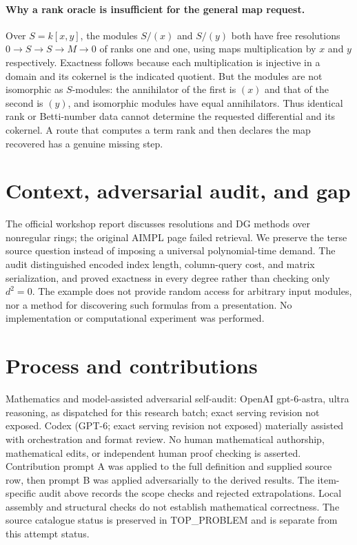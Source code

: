 \documentclass[11pt]{article}
\begin{document}
\paragraph{Why a rank oracle is insufficient for the general map request.}
Over $S=k[x,y]$, the modules $S/(x)$ and $S/(y)$ both have free resolutions
$0\to S\to S\to M\to0$ of ranks one and one, using maps multiplication
by $x$ and $y$ respectively. Exactness follows because each multiplication
is injective in a domain and its cokernel is the indicated quotient.
But the modules are not isomorphic as $S$-modules: the annihilator of the
first is $(x)$ and that of the second is $(y)$, and isomorphic modules have
equal annihilators. Thus identical rank or Betti-number data cannot determine
the requested differential and its cokernel. A route that computes a term
rank and then declares the map recovered has a genuine missing step.

\section{Context, adversarial audit, and gap}
The official workshop report discusses resolutions and DG methods over
nonregular rings; the original AIMPL page failed retrieval. We preserve the
terse source question instead of imposing a universal polynomial-time demand.
The audit distinguished encoded index length, column-query cost, and matrix
serialization, and proved exactness in every degree rather than checking
only $d^2=0$. The example does not provide random access for arbitrary input
modules, nor a method for discovering such formulas from a presentation.
No implementation or computational experiment was performed.

\section{Process and contributions}
Mathematics and model-assisted adversarial self-audit: OpenAI gpt-6-astra, ultra reasoning, as dispatched for this research batch; exact serving revision not exposed. Codex (GPT-6; exact serving revision not exposed) materially assisted with orchestration and format review. No human mathematical authorship, mathematical edits, or independent human proof checking is asserted.
Contribution prompt A was applied to the full definition and supplied source row, then prompt B was applied adversarially to the derived results. The item-specific audit above records the scope checks and rejected extrapolations. Local assembly and structural checks do not establish mathematical correctness. The source catalogue status is preserved in TOP\_PROBLEM and is separate from this attempt status.
\end{document}
